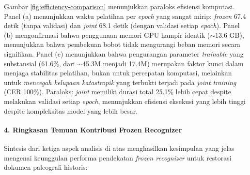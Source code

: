 \documentclass[12pt,a4paper]{article}
\begin{document}
Gambar \ref{fig:efficiency-comparison} menunjukkan paraloks efisiensi komputasi. Panel (a) menunjukkan waktu pelatihan per \textit{epoch} yang sangat mirip: \textit{frozen} 67.4 detik (tanpa validasi) dan \textit{joint} 68.1 detik (dengan validasi setiap \textit{epoch}). Panel (b) mengonfirmasi bahwa penggunaan memori GPU hampir identik ($\sim$13.6 GB), menunjukkan bahwa pembekuan bobot tidak mengurangi beban memori secara signifikan. Panel (c) menunjukkan bahwa pengurangan parameter \textit{trainable} yang substansial (61.6\%, dari $\sim$45.3M menjadi 17.4M) merupakan faktor kunci dalam menjaga stabilitas pelatihan, bukan untuk percepatan komputasi, melainkan untuk \textit{mencegah \textit{kelupaan katastropik}} yang terbukti terjadi pada \textit{joint training} (CER 100\%). Paraloks: \textit{joint} memiliki durasi total 25.1\% lebih cepat despite melakukan validasi setiap \textit{epoch}, menunjukkan efisiensi eksekusi yang lebih tinggi despite kompleksitas model yang lebih besar.

\vspace{0.5em}

\paragraph{4. Ringkasan Temuan Kontribusi Frozen Recognizer}

Sintesis dari ketiga aspek analisis di atas menghasilkan kesimpulan yang jelas mengenai keunggulan performa pendekatan \textit{frozen recognizer} untuk restorasi dokumen paleografi historis:
\end{document}
